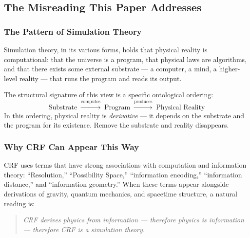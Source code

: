 \documentclass[12pt, a4paper]{article}
\begin{document}

\subsection{The Misreading This Paper Addresses}

\subsubsection{The Pattern of Simulation Theory}

Simulation theory, in its various forms, holds that physical reality
is computational: that the universe is a program, that physical laws
are algorithms, and that there exists some external substrate ---
a computer, a mind, a higher-level reality --- that runs the
program and reads its output.

The structural signature of this view is a specific ontological
ordering:
\[
\text{Substrate} \;\xrightarrow{\text{computes}}\;
\text{Program} \;\xrightarrow{\text{produces}}\;
\text{Physical Reality}
\]
In this ordering, physical reality is \emph{derivative} --- it
depends on the substrate and the program for its existence.
Remove the substrate and reality disappears.

\subsubsection{Why CRF Can Appear This Way}

CRF uses terms that have strong associations with computation and
information theory: ``Resolution,'' ``Possibility Space,''
``information encoding,'' ``information distance,'' and
``information geometry.'' When these terms appear alongside
derivations of gravity, quantum mechanics, and spacetime structure,
a natural reading is:

\begin{quote}
\textit{CRF derives physics from information ---
therefore physics is information ---
therefore CRF is a simulation theory.}
\end{quote}
\end{document}
